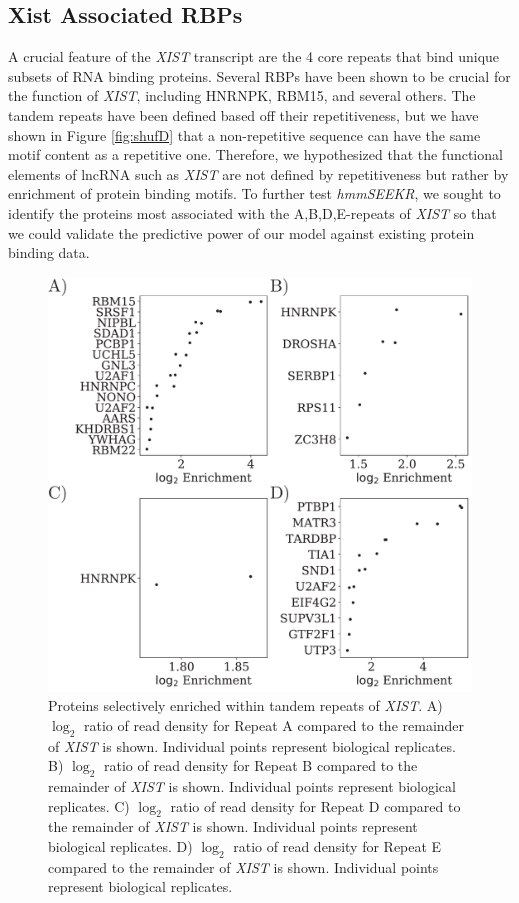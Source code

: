 \subsection{Xist Associated RBPs}
A crucial feature of the \emph{XIST} transcript are the 4 core repeats that bind unique subsets of RNA binding proteins. Several RBPs have been shown to be crucial for the function of \emph{XIST}, including HNRNPK, RBM15, and several others. The tandem repeats have been defined based off their repetitiveness, but we have shown in Figure \ref{fig:shufD} that a non-repetitive sequence can have the same motif content as a repetitive one. Therefore, we hypothesized that the functional elements of lncRNA such as \emph{XIST} are not defined by repetitiveness but rather by enrichment of protein binding motifs. To further test \emph{hmmSEEKR}, we sought to identify the proteins most associated with the A,B,D,E-repeats of \emph{XIST} so that we could validate the predictive power of our model against existing protein binding data.
\begin{figure}[h!]
\centering
\includegraphics[width=\textwidth]{images/sigproteins.pdf}
\caption{Proteins selectively enriched within tandem repeats of \emph{XIST}. A) $\log_2$ ratio of read density for Repeat A compared to the remainder of \emph{XIST} is shown. Individual points represent biological replicates. B) $\log_2$ ratio of read density for Repeat B compared to the remainder of \emph{XIST} is shown. Individual points represent biological replicates. C) $\log_2$ ratio of read density for Repeat D compared to the remainder of \emph{XIST} is shown. Individual points represent biological replicates. D) $\log_2$ ratio of read density for Repeat E compared to the remainder of \emph{XIST} is shown. Individual points represent biological replicates.}
\label{fig:xistproteins}
\end{figure}

